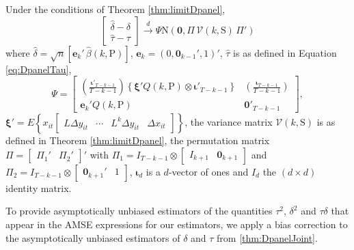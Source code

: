 \begin{thm}
  \label{thm:DpanelJoint}
  Under the conditions of Theorem \ref{thm:limitDpanel},
  \[
    \left[
      \begin{array}{c} 
        \widehat{\delta} - \delta \\ \widehat{\tau} - \tau 
      \end{array} 
    \right] \overset{d}{\rightarrow} \Psi \mbox{N}\left(\mathbf{0}, \Pi\,\mathcal{V}\left(k,\text{S}\right)\,\Pi'\right)
  \]
  where $\widehat{\delta} = \sqrt{n}[ \mathbf{e}_k' \,\widehat{\beta}(k,\text{P})]$, $\mathbf{e}_k = (0, \mathbf{0}_{k-1}', 1)'$,  $\widehat{\tau}$ is as defined in Equation \ref{eq:DpanelTau}, 
\[
  \Psi = \left[
  \begin{array}{cc}
    \displaystyle\left( \frac{\boldsymbol{\iota}'_{T-k-1}}{T-k-1} \right)  \left\{ \boldsymbol{\xi}' Q(k,\text{P}) \otimes \boldsymbol{\iota}'_{T-k-1} \right\}& \displaystyle \left(\frac{\boldsymbol{\iota}_{T-k-1}}{T-k-1}\right) \\ 
    \mathbf{e}_k' Q(k,\text{P}) & \mathbf{0}'_{T-k-1}
  \end{array}
\right],
\]
  $\boldsymbol{\xi}' = E\left\{ x_{it} \left[
    \begin{array}{cccc}
      L \Delta y_{it} & \cdots & L^k \Delta y_{it} & \Delta x_{it}
  \end{array} \right]\right\}$,
  the variance matrix $\mathcal{V}(k,\text{S})$ is as defined in Theorem \ref{thm:limitDpanel}, the permutation matrix $\Pi = \left[
  \begin{array}{cc}
    \Pi_1' & \Pi_2'
  \end{array}
\right]'$ with $\Pi_1 = I_{T-k-1} \otimes \left[
\begin{array}{cc}
  I_{k+1} & \mathbf{0}_{k+1}
\end{array}
\right]$ and $\Pi_2 = I_{T-k-1}\otimes \left[
\begin{array}{cc}
  \mathbf{0}_{k+1}' & 1
\end{array}
\right]$,
  $\boldsymbol{\iota}_{d}$ is a $d$-vector of ones and $I_d$ the $(d\times d)$ identity matrix.
\end{thm}

To provide asymptotically unbiased estimators of the quantities $\tau^2$, $\delta^2$ and $\tau\delta$ that appear in the AMSE expressions for our estimators, we apply a bias correction to the asymptotically unbiased estimators of $\delta$ and $\tau$ from \ref{thm:DpanelJoint}.


